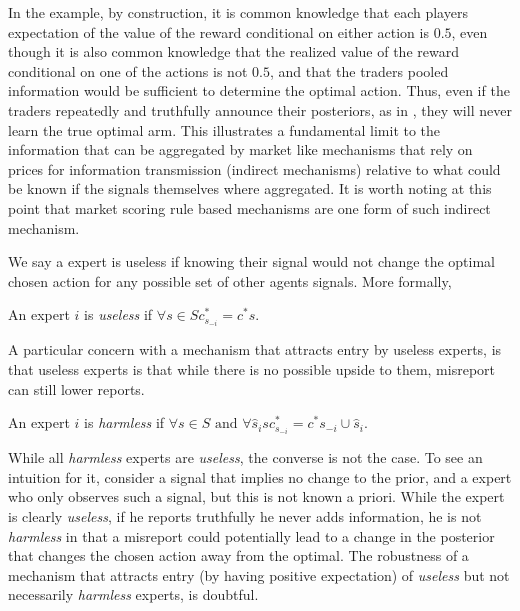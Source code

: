 In the example, by construction, it is common knowledge that each players expectation of the value of the reward conditional on either action is $0.5$, even though it is also common knowledge that the realized value of the reward conditional on one of the actions is not $0.5$, and that the traders pooled information would be sufficient to determine the optimal action. 
Thus, even if the traders repeatedly and truthfully announce their posteriors, as in \cite{geanakoplos1982we}, they will never learn the true optimal arm. 
This illustrates a fundamental limit to the information that can be aggregated by market like mechanisms that rely on prices for information transmission (indirect mechanisms) relative to what could be known if the signals themselves where aggregated. 
It is worth noting at this point that market scoring rule based mechanisms are one form of such indirect mechanism.


We say a expert is useless if knowing their signal would not change the optimal chosen action for any possible set of other agents signals. More formally,

\begin{defn}\label{defn:useless}
	An expert $i$ is \emph{useless} if $\forall s  \in S c^{*}_{s_{-i}} = c^{*}{s}$.
\end{defn}

A particular concern with a mechanism that attracts entry by useless experts, is that useless experts is that while there is no possible upside to them, misreport can still lower reports.

\begin{defn}\label{defn:harmless}
	An expert $i$ is \emph{harmless} if $\forall s \in S \text{ and }\forall \hat{s}_i s c^{*}_{s_{-i}} = c^{*}{s_{-i} \cup \hat{s}_i}$.
\end{defn}

While all \emph{harmless} experts are \emph{useless}, the converse is not the case. To see an intuition for it, consider a signal that implies no change to the prior, and a expert who only observes such a signal, but this is not known a priori. While the expert is clearly \emph{useless}, if he reports truthfully he never adds information, he is not \emph{harmless} in that a misreport could potentially lead to a change in the posterior that changes the chosen action away from the optimal.
The robustness of a mechanism that attracts entry (by having positive expectation) of \emph{useless} but not necessarily \emph{harmless}  experts, is doubtful.

